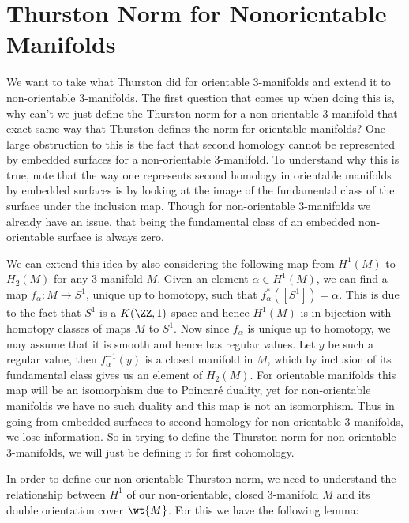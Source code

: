 \section{Thurston Norm for Nonorientable Manifolds}

We want to take what Thurston did for orientable 3-manifolds and extend it to non-orientable 3-manifolds. The first question that comes up when doing this is, why can't we just define the Thurston norm for a non-orientable 3-manifold that exact same way that Thurston defines the norm for orientable manifolds? One large obstruction to this is the fact that second homology cannot be represented by embedded surfaces for a non-orientable 3-manifold. To understand why this is true, note that the way one represents second homology in orientable manifolds by embedded surfaces is by looking at the image of the fundamental class of the surface under the inclusion map. Though for non-orientable 3-manifolds we already have an issue, that being the fundamental class of an embedded non-orientable surface is always zero.

We can extend this idea by also considering the following map from $H^1(M)$ to $H_2(M)$ for any 3-manifold $M$. Given an element $\alpha \in H^1(M)$, we can find a map $f_\alpha: M \xrightarrow[]{} S^1$, unique up to homotopy, such that $f_\alpha^*([S^1]) = \alpha$. This is due to the fact that $S^1$ is a $K(\ZZ,1)$ space and hence $H^1(M)$ is in bijection with homotopy classes of maps $M$ to $S^1$. Now since $f_\alpha$ is unique up to homotopy, we may assume that it is smooth and hence has regular values. Let $y$ be such a regular value, then $f_\alpha^{-1}(y)$ is a closed manifold in $M$, which by inclusion of its fundamental class gives us an element of $H_2(M)$. For orientable manifolds this map will be an isomorphism due to Poincar\'e duality, yet for non-orientable manifolds we have no such duality and this map is not an isomorphism. Thus in going from embedded surfaces to second homology for non-orientable 3-manifolds, we lose information. So in trying to define the Thurston norm for non-orientable 3-manifolds, we will just be defining it for first cohomology.

In order to define our non-orientable Thurston norm, we need to understand the relationship between $H^1$ of our non-orientable, closed 3-manifold $M$ and its double orientation cover $\wt{M}$. For this we have the following lemma:

